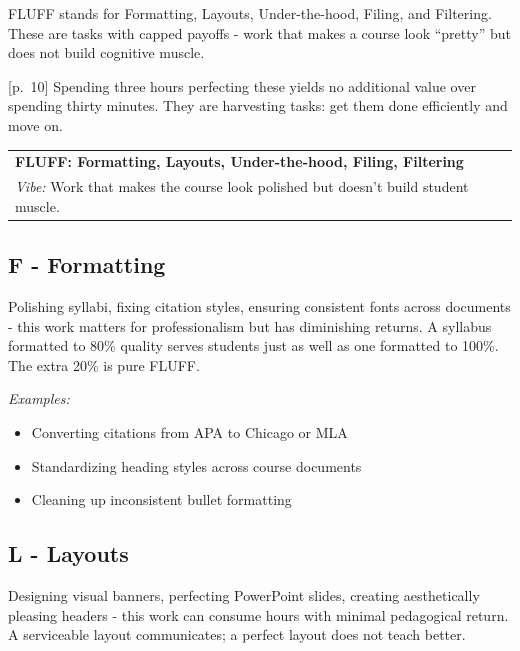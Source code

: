 \documentclass[
  letterpaper,
  DIV=11,
  numbers=noendperiod]{scrreprt}
\newcounter{none} %
\providecommand{\tightlist}{%
  \setlength{\itemsep}{0pt}\setlength{\parskip}{0pt}}
\begin{document}
FLUFF stands for Formatting, Layouts, Under-the-hood, Filing, and
Filtering. These are tasks with capped payoffs - work that makes a
course look ``pretty'' but does not build cognitive muscle.

{[}p.~10{]} Spending three hours perfecting these yields no additional
value over spending thirty minutes. They are harvesting tasks: get them
done efficiently and move on.

{\def\LTcaptype{none} %
\begin{longtable}[]{@{}
  >{\raggedright\arraybackslash}p{}@{}}
\toprule\noalign{}
\endhead
\bottomrule\noalign{}
\endlastfoot
\textbf{FLUFF: Formatting, Layouts, Under-the-hood, Filing,
Filtering} \\
\emph{Vibe:} Work that makes the course look polished but doesn't build
student muscle. \\
\end{longtable}
}

\subsection{F - Formatting}\label{f---formatting}

Polishing syllabi, fixing citation styles, ensuring consistent fonts
across documents - this work matters for professionalism but has
diminishing returns. A syllabus formatted to 80\% quality serves
students just as well as one formatted to 100\%. The extra 20\% is pure
FLUFF.

\emph{Examples:}

\begin{itemize}
\tightlist
\item
  Converting citations from APA to Chicago or MLA
\item
  Standardizing heading styles across course documents
\item
  Cleaning up inconsistent bullet formatting
\end{itemize}

\subsection{L - Layouts}\label{l---layouts}

Designing visual banners, perfecting PowerPoint slides, creating
aesthetically pleasing headers - this work can consume hours with
minimal pedagogical return. A serviceable layout communicates; a perfect
layout does not teach better.
\end{document}
